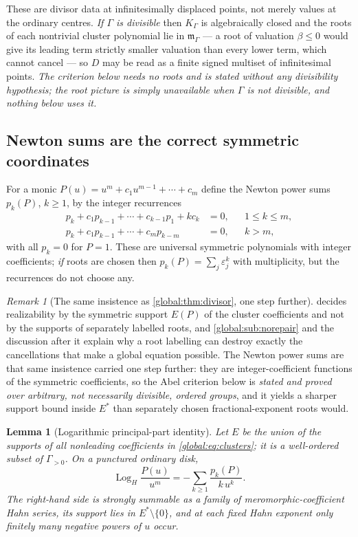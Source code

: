 \documentclass[11pt,letterpaper]{article}
\newtheorem{lemma}[lemma]{Lemma}
\theoremstyle{definition}
\theoremstyle{remark}
\newtheorem{remark}[remark]{Remark}
\newcommand{\KK}{K_\Gamma}
\newcommand{\mK}{\mathfrak m_\Gamma}
\newcommand{\LogH}{\operatorname{Log}_{H}}
\numberwithin{equation}{section}
\begin{document}
These are divisor data at infinitesimally displaced points, not merely values at the ordinary centres. \emph{If $\Gamma$ is divisible} then $\KK$ is algebraically closed \cite[Corollary~4]{Poonen} and the roots of each nontrivial cluster polynomial lie in $\mK$ --- a root of valuation $\beta\le0$ would give its leading term strictly smaller valuation than every lower term, which cannot cancel --- so $D$ may be read as a finite signed multiset of infinitesimal points. \emph{The criterion below needs no roots and is stated without any divisibility hypothesis; the root picture is simply unavailable when $\Gamma$ is not divisible, and nothing below uses it.}

\subsection{Newton sums are the correct symmetric coordinates}

For a monic $P(u)=u^m+c_1u^{m-1}+\cdots+c_m$ define the Newton power sums $p_k(P)$, $k\ge1$, by the integer recurrences
\begin{align}
  p_k+c_1p_{k-1}+\cdots+c_{k-1}p_1+kc_k&=0,&&1\le k\le m,\label{global:eq:newtonlow}\\
  p_k+c_1p_{k-1}+\cdots+c_mp_{k-m}&=0,&&k>m,\label{global:eq:newtonhigh}
\end{align}
with all $p_k=0$ for $P=1$. These are universal symmetric polynomials with integer coefficients; \emph{if} roots are chosen then $p_k(P)=\sum_j\varepsilon_j^k$ with multiplicity, but the recurrences do not choose any.

\begin{remark}[The same insistence as \cref{global:thm:divisor}, one step further]\label{global:rem:symmetricagain}
 decides realizability by the symmetric support $E(P)$ of the cluster coefficients and not by the supports of separately labelled roots, and \cref{global:sub:norepair} and the discussion after it explain why a root labelling can destroy exactly the cancellations that make a global equation possible. The Newton power sums are that same insistence carried one step further: they are integer-coefficient functions of the symmetric coefficients, so the Abel criterion below is \emph{stated and proved over arbitrary, not necessarily divisible, ordered groups}, and it yields a sharper support bound inside $E^*$ than separately chosen fractional-exponent roots would.
\end{remark}

\begin{lemma}[Logarithmic principal-part identity]\label{global:lem:lognewton}
Let $E$ be the union of the supports of all nonleading coefficients in \eqref{global:eq:clusters}; it is a well-ordered subset of $\Gamma_{>0}$. On a punctured ordinary disk,
\begin{equation}\label{global:eq:lognewton}
  \LogH\frac{P(u)}{u^m}=-\sum_{k\ge1}\frac{p_k(P)}{k\,u^k}.
\end{equation}
The right-hand side is strongly summable as a family of meromorphic-coefficient Hahn series, its support lies in $E^*\setminus\{0\}$, and at each fixed Hahn exponent only finitely many negative powers of $u$ occur.
\end{lemma}
\end{document}
